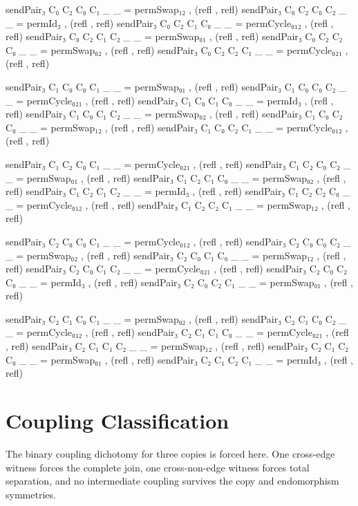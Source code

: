 \documentclass[11pt,a4paper]{book}
\begin{document}
\begin{code}
sendPair₃ C₀ C₂ C₀ C₁ _ _ = permSwap₁₂ , (refl , refl)
sendPair₃ C₀ C₂ C₀ C₂ _ _ = permId₃ , (refl , refl)
sendPair₃ C₀ C₂ C₁ C₀ _ _ = permCycle₀₁₂ , (refl , refl)
sendPair₃ C₀ C₂ C₁ C₂ _ _ = permSwap₀₁ , (refl , refl)
sendPair₃ C₀ C₂ C₂ C₀ _ _ = permSwap₀₂ , (refl , refl)
sendPair₃ C₀ C₂ C₂ C₁ _ _ = permCycle₀₂₁ , (refl , refl)

sendPair₃ C₁ C₀ C₀ C₁ _ _ = permSwap₀₁ , (refl , refl)
sendPair₃ C₁ C₀ C₀ C₂ _ _ = permCycle₀₂₁ , (refl , refl)
sendPair₃ C₁ C₀ C₁ C₀ _ _ = permId₃ , (refl , refl)
sendPair₃ C₁ C₀ C₁ C₂ _ _ = permSwap₀₂ , (refl , refl)
sendPair₃ C₁ C₀ C₂ C₀ _ _ = permSwap₁₂ , (refl , refl)
sendPair₃ C₁ C₀ C₂ C₁ _ _ = permCycle₀₁₂ , (refl , refl)

sendPair₃ C₁ C₂ C₀ C₁ _ _ = permCycle₀₂₁ , (refl , refl)
sendPair₃ C₁ C₂ C₀ C₂ _ _ = permSwap₀₁ , (refl , refl)
sendPair₃ C₁ C₂ C₁ C₀ _ _ = permSwap₀₂ , (refl , refl)
sendPair₃ C₁ C₂ C₁ C₂ _ _ = permId₃ , (refl , refl)
sendPair₃ C₁ C₂ C₂ C₀ _ _ = permCycle₀₁₂ , (refl , refl)
sendPair₃ C₁ C₂ C₂ C₁ _ _ = permSwap₁₂ , (refl , refl)

sendPair₃ C₂ C₀ C₀ C₁ _ _ = permCycle₀₁₂ , (refl , refl)
sendPair₃ C₂ C₀ C₀ C₂ _ _ = permSwap₀₂ , (refl , refl)
sendPair₃ C₂ C₀ C₁ C₀ _ _ = permSwap₁₂ , (refl , refl)
sendPair₃ C₂ C₀ C₁ C₂ _ _ = permCycle₀₂₁ , (refl , refl)
sendPair₃ C₂ C₀ C₂ C₀ _ _ = permId₃ , (refl , refl)
sendPair₃ C₂ C₀ C₂ C₁ _ _ = permSwap₀₁ , (refl , refl)

sendPair₃ C₂ C₁ C₀ C₁ _ _ = permSwap₀₂ , (refl , refl)
sendPair₃ C₂ C₁ C₀ C₂ _ _ = permCycle₀₁₂ , (refl , refl)
sendPair₃ C₂ C₁ C₁ C₀ _ _ = permCycle₀₂₁ , (refl , refl)
sendPair₃ C₂ C₁ C₁ C₂ _ _ = permSwap₁₂ , (refl , refl)
sendPair₃ C₂ C₁ C₂ C₀ _ _ = permSwap₀₁ , (refl , refl)
sendPair₃ C₂ C₁ C₂ C₁ _ _ = permId₃ , (refl , refl)
\end{code}

\section{Coupling Classification}

The binary coupling dichotomy for three copies is forced here.
One cross-edge witness forces the complete join, one cross-non-edge witness
forces total separation, and no intermediate coupling survives the copy and
endomorphism symmetries.
\end{document}
